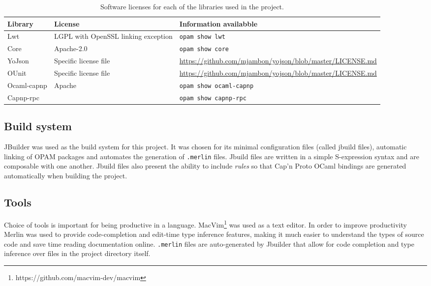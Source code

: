 \begin{table}
\centering
\begin{tabular}{ | l  | p{3.0cm}| p{7.0cm} | } \hline
   \textbf{Library} & \textbf{License} & \textbf{Information availabble} \\ \hline
    Lwt & LGPL with OpenSSL linking exception & \texttt{opam show lwt} \\ \hline
    Core & Apache-2.0 & \texttt{opam show core} \\ \hline
    YoJson & Specific license file & \url{https://github.com/mjambon/yojson/blob/master/LICENSE.md} \\ \hline
    OUnit & Specific license file & \url{https://github.com/mjambon/yojson/blob/master/LICENSE.md} \\ \hline
    Ocaml-capnp & Apache &  \texttt{opam show ocaml-capnp} \\
    Capnp-rpc & & \texttt{opam show capnp-rpc} \\ \hline
\end{tabular}
\caption{Software licenses for each of the libraries used in the project.}
\label{table:software-licenses}
\end{table}

\subsection{Build system}
JBuilder was used as the build system for this project. It was chosen for its minimal configuration files (called jbuild files), automatic linking of OPAM packages and automates the generation of \texttt{.merlin} files. Jbuild files are written in a simple S-expression syntax and are composable with one another. Jbuild files also present the ability to include \emph{rules} so that Cap'n Proto OCaml bindings are generated automatically when building the project.

\subsection{Tools}
  
Choice of tools is important for being productive in a language. MacVim\footnote{https://github.com/macvim-dev/macvim} was used as a text editor. In order to improve productivity Merlin was used to provide code-completion and edit-time type inference features, making it much easier to understand the types of source code and save time reading documentation online. \texttt{.merlin} files are auto-generated by Jbuilder that allow for code completion and type inference over files in the project directory itself. \\

